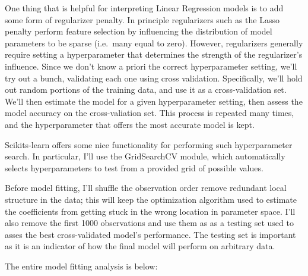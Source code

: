 \documentclass{article}
\begin{document}
One thing that is helpful for interpreting Linear Regression models is
to add some form of regularizer penalty. In principle regularizers such
as the Lasso penalty perform feature selection by influencing the
distribution of model parameters to be sparse (i.e.~many equal to zero).
However, regularizers generally require setting a hyperparameter that
determines the strength of the regularizer's influence. Since we don't
know a priori the correct hyperparameter setting, we'll try out a bunch,
validating each one using cross validation. Specifically, we'll hold out
random portions of the training data, and use it as a cross-validation
set. We'll then estimate the model for a given hyperparameter setting,
then assess the model accuracy on the cross-valiation set. This process
is repeated many times, and the hyperparameter that offers the most
accurate model is kept.

Scikits-learn offers some nice functionality for performing such
hyperparameter search. In particular, I'll use the GridSearchCV module,
which automatically selects hyperparameters to test from a provided grid
of possible values.

Before model fitting, I'll shuffle the observation order remove
redundant local structure in the data; this will keep the optimization
algorithm used to estimate the coefficients from getting stuck in the
wrong location in parameter space. I'll also remove the first 1000
observations and use them as as a testing set used to asses the best
cross-validated model's performance. The testing set is important as it
is an indicator of how the final model will perform on arbitrary data.

The entire model fitting analysis is below:
\end{document}
